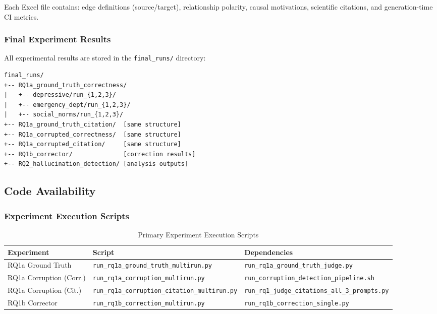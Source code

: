 Each Excel file contains: edge definitions (source/target), relationship polarity, causal motivations, scientific citations, and generation-time CI metrics.

\subsubsection{Final Experiment Results}

All experimental results are stored in the \texttt{final\_runs/} directory:

\begin{verbatim}
final_runs/
+-- RQ1a_ground_truth_correctness/
|   +-- depressive/run_{1,2,3}/
|   +-- emergency_dept/run_{1,2,3}/
|   +-- social_norms/run_{1,2,3}/
+-- RQ1a_ground_truth_citation/  [same structure]
+-- RQ1a_corrupted_correctness/  [same structure]
+-- RQ1a_corrupted_citation/     [same structure]
+-- RQ1b_corrector/              [correction results]
+-- RQ2_hallucination_detection/ [analysis outputs]
\end{verbatim}

\subsection{Code Availability}
\label{sec:code_availability}

\subsubsection{Experiment Execution Scripts}

\begin{table}[H]
\centering
\caption{Primary Experiment Execution Scripts}
\label{tab:exec_scripts}
\footnotesize
\begin{tabularx}{\textwidth}{@{}l X X@{}}
\toprule
\textbf{Experiment} & \textbf{Script} & \textbf{Dependencies} \\
\midrule
RQ1a Ground Truth & \texttt{run\_rq1a\_ground\_truth\_multirun.py} & \texttt{run\_rq1a\_ground\_truth\_judge.py} \\
RQ1a Corruption (Corr.) & \texttt{run\_rq1a\_corruption\_multirun.py} & \texttt{run\_corruption\_detection\_pipeline.sh} \\
RQ1a Corruption (Cit.) & \texttt{run\_rq1a\_corruption\_citation\_multirun.py} & \texttt{run\_rq1\_judge\_citations\_all\_3\_prompts.py} \\
RQ1b Corrector & \texttt{run\_rq1b\_correction\_multirun.py} & \texttt{run\_rq1b\_correction\_single.py} \\
\bottomrule
\end{tabularx}
\end{table}

